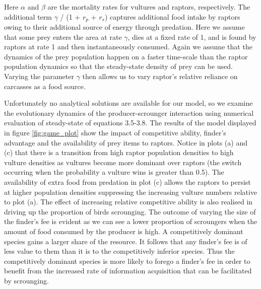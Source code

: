 Here $\alpha$ and $\beta$ are the mortality rates for vultures and raptors, respectively. The additional term $\gamma$ / (1 + $r_p$ + $r_s$) captures additional food intake by raptors owing to their additional source of energy through predation. Here we assume that some prey enters the area at rate $\gamma$, dies at a fixed rate of 1, and is found by raptors at rate 1 and then instantaneously consumed. Again we assume that the dynamics of the prey population happen on a faster time-scale than the raptor population dynamics so that the steady-state density of prey can be used. Varying the parameter $\gamma$ then allows us to vary raptor's relative reliance on carcasses as a food source. 

Unfortunately no analytical solutions are available for our model, so we examine the evolutionary dynamics of the producer-scrounger interaction using numerical evaluation of steady-state of equations 3.5-3.8. The results of the model displayed in figure \ref{fig:game_plot} show the impact of competitive ability, finder's advantage and the availability of prey items to raptors. Notice in plots (a) and (c) that there is a transition from high raptor population densities to high vulture densities as vultures become more dominant over raptors (the switch occurring when the probability a vulture wins is greater than 0.5).  The availability of extra food from predation in plot (c) allows the raptors to persist at higher population densities suppressing the increasing vulture numbers relative to plot (a).  The effect of increasing relative competitive ability is also realised in driving up the proportion of birds scrounging. The outcome of varying the size of the finder's fee is evident as we can see a lower proportion of scroungers when the amount of food consumed by the producer is high. A competitively dominant species gains a larger share of the resource. It follows that any finder's fee is of less value to them than it is to the competitively inferior species. Thus the competitively dominant species is more likely to forego a finder's fee in order to benefit from the increased rate of information acquisition that can be facilitated by scrounging.


